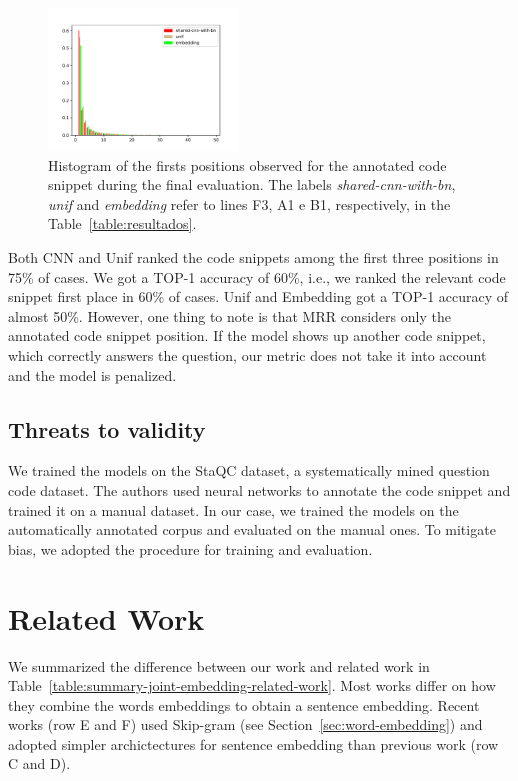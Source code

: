 \documentclass[sigconf]{acmart}
\begin{document}
\begin{figure}[H]
    \centering
    \includegraphics[width=0.45\textwidth]{figuras/histogram.pdf}
    \caption{Histogram of the firsts positions observed for the annotated code snippet during the final evaluation. The labels \emph{shared-cnn-with-bn}, \emph{unif} and \emph{embedding} refer to lines F3, A1 e B1, respectively, in the Table~\ref{table:resultados}.}
    \label{fig:histogram-mrr}
\end{figure}


Both CNN and Unif ranked the code snippets among the first three positions in 75\% of cases. We got a TOP-1 accuracy of 60\%, i.e., we ranked the relevant code snippet first place in 60\% of cases. Unif and Embedding got a TOP-1 accuracy of almost 50\%. However, one thing to note is that MRR considers only the annotated code snippet position. If the model shows up another code snippet, which correctly answers the question, our metric does not take it into account and the model is penalized. 

\subsection{Threats to validity}

We trained the models on the StaQC dataset, a systematically mined question code dataset. The authors used neural networks to annotate the code snippet and trained it on a manual dataset. In our case, we trained the models on the automatically annotated corpus and evaluated on the manual ones. To mitigate bias, we adopted the \citet{iyer-etal-2016-summarizing} procedure for training and evaluation.

\section{Related Work}

We summarized the difference between our work and related work in Table~\ref{table:summary-joint-embedding-related-work}. Most works differ on how they combine the words embeddings to obtain a sentence embedding. Recent works (row E and F) used Skip-gram (see Section~\ref{sec:word-embedding}) and adopted simpler archictectures for sentence embedding than previous work (row C and D).  
\end{document}
